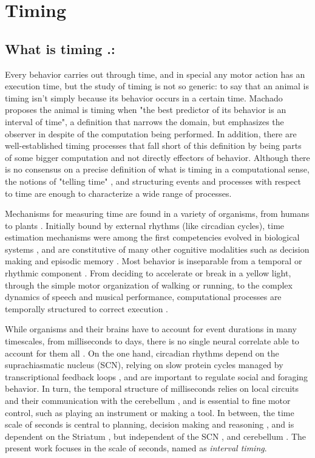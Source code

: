 \chapter{Timing}
\section{What is timing .:}
    Every behavior carries out through time, and in special any motor action has an execution time, but the study of timing is not so generic: to say that an animal is timing isn't simply because its behavior occurs in a certain time. Machado \cite{machado2009learning} proposes the animal is timing when "the best predictor of its behavior is an interval of time", a definition that narrows the domain, but emphasizes the observer in despite of the computation being performed. In addition, there are well-established timing processes that fall short of this definition by being parts of some bigger computation and not directly effectors of behavior. Although there is no consensus on a precise definition of what is timing in a computational sense, the notions of "telling time" \cite{}, and structuring events and processes with respect to time \cite{} are enough to characterize a wide range of processes.
    
    Mechanisms for measuring time are found in a variety of organisms, from humans to plants \cite{cashmore2003cryptochromes}. Initially bound by external rhythms (like circadian cycles), time estimation mechanisms were among the first competencies evolved in biological systems \cite{paranjpe2005evolution}, and are constitutive of many other cognitive modalities such as decision making and episodic memory \cite{maniadakis2014time}. Most behavior is inseparable from a temporal or rhythmic component \cite{buhusi2005makes}. From deciding to accelerate or break in a yellow light, through the simple motor organization of walking or running, to the complex dynamics of speech and musical performance, computational processes are temporally structured to correct execution \cite{bueti2014temporal}. 
    
    While organisms and their brains have to account for event durations in many timescales, from milliseconds to days, there is no single neural correlate able to account for them all \cite{buhusi2005makes, buhusi2016clocks, hardy2016neurocomputational, lewis2003distinct, mauk2004neural}. On the one hand, circadian rhythms depend on the suprachiasmatic nucleus (SCN), relying on slow protein cycles managed by transcriptional feedback loops \cite{buhusi2005makes}, and are important to regulate social and foraging behavior. In turn, the temporal structure of milliseconds relies on local circuits and their communication with the cerebellum \cite{ohmae2017cerebellar}, and is essential to fine motor control, such as playing an instrument or making a tool. In between, the time scale of seconds is central to planning, decision making and reasoning \cite{buhusi2005makes}, and is dependent on the Striatum \cite{mello2015scalable}, but independent of the SCN \cite{lewis2003interval}, and cerebellum \cite{harrington2004does}. The present work focuses in the scale of seconds, named as \textit{interval timing}.
    
